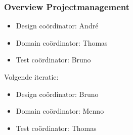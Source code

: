 \documentclass{beamer}
\begin{document}
\begin{frame}
\frametitle{Overview Projectmanagement}

\begin{itemize}
    \item Design co\"ordinator: Andr\'e
    \item Domain co\"ordinator: Thomas
    \item Test co\"ordinator: Bruno
\end{itemize}

Volgende iteratie:

\begin{itemize}
    \item Design co\"ordinator: Bruno
    \item Domain co\"ordinator: Menno
    \item Test co\"ordinator: Thomas
\end{itemize}

\begin{figure}

\end{figure}

\end{frame}
\end{document}
